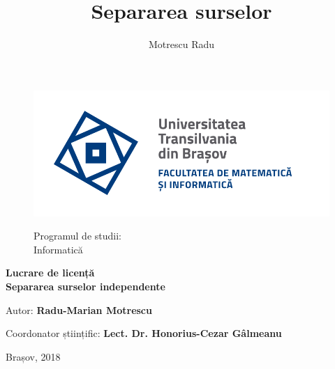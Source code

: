 \documentclass[12pt,oneside]{article}
\title{Separarea surselor}
\author{Motrescu Radu}
\date{}
\begin{document}
\thispagestyle{empty}
\begin{titlepage}
	\begin{center}
\begin{figure}[H]
			\begin{minipage}[l]{70pt}
				\includegraphics[scale=0.4]{sigla}
			\end{minipage}
			\begin{minipage}[c]{300pt}
				\begin{flushright}
					{\large}{Programul de studii:\\	\vspace{0.3em}
							Informatică}
				\end{flushright}
			\end{minipage}
		\end{figure}
        \centering
        \vspace{4\baselineskip}
        {\Huge
        \textbf{Lucrare de licență}\\ \textbf{Separarea surselor independente}\par}
        \vspace{15\baselineskip}
		\par
		\begin{flushleft}
        {\large{Autor: \hspace{35mm}	\textbf{Radu-Marian Motrescu}}\par}
        {\large{Coordonator științific: \hspace{1mm} \textbf{Lect. Dr. Honorius-Cezar Gâlmeanu}}\par}
		\end{flushleft}
		\vfill
		\par
        {\Large{Brașov, 2018}\par}
    \end{center}
\end{titlepage}
\end{document}
